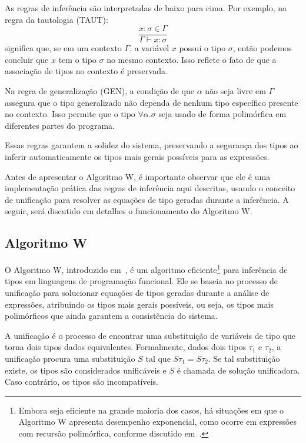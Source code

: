 As regras de inferência são interpretadas de baixo para cima.
Por exemplo, na regra da tautologia (TAUT):
\[
  \frac{x : \sigma \in \Gamma}{\Gamma \vdash x : \sigma}
\]
significa que, se em um contexto $\Gamma$, a variável $x$ possui o tipo $\sigma$, então podemos concluir que $x$ tem o tipo $\sigma$ no mesmo contexto.
Isso reflete o fato de que a associação de tipos no contexto é preservada.

Na regra de generalização (GEN), a condição de que $\alpha$ não seja livre em $\Gamma$ assegura que o tipo generalizado não dependa de nenhum tipo específico presente no contexto.
Isso permite que o tipo $\forall \alpha. \sigma$ seja usado de forma polimórfica em diferentes partes do programa.

Essas regras garantem a solidez do sistema, preservando a segurança dos tipos ao inferir automaticamente os tipos mais gerais possíveis para as expressões.

Antes de apresentar o Algoritmo W, é importante observar que ele é uma implementação prática das regras de inferência aqui descritas, usando o conceito de unificação para resolver as equações de tipo geradas durante a inferência.
A seguir, será discutido em detalhes o funcionamento do Algoritmo W.

\subsection{Algoritmo W}\label{subsec:w-algo}

O Algoritmo W, introduzido em~, é um algoritmo eficiente\footnote{Embora seja eficiente na grande maioria dos casos, há situações em que o Algoritmo W apresenta desempenho exponencial, como ocorre em expressões com recursão polimórfica, conforme discutido em~\cite{CRISTIANO2004}.} para inferência de tipos em linguagens de programação funcional.
Ele se baseia no processo de unificação para solucionar equações de tipos geradas durante a análise de expressões, atribuindo os tipos mais gerais possíveis, ou seja, os tipos mais polimórficos que ainda garantem a consistência do sistema.

A unificação é o processo de encontrar uma substituição de variáveis de tipo que torna dois tipos dados equivalentes.
Formalmente, dados dois tipos $\tau_1$ e $\tau_2$, a unificação procura uma substituição $S$ tal que $S\tau_1 = S\tau_2$.
Se tal substituição existe, os tipos são considerados unificáveis e $S$ é chamada de solução unificadora.
Caso contrário, os tipos são incompatíveis.

